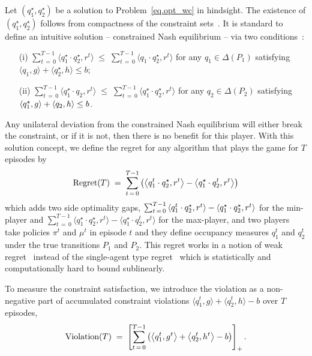 \documentclass[12pt, final]{l4dc2023}
\begin{document}
Let $(q_1^\star,q_2^\star)$ be a solution to Problem~\eqref{eq.opt_wc} in hindsight. The existence of $(q_1^\star,q_2^\star)$ follows from compactness of the constraint sets~\citep{neumann1928theorie,rosen1965existence}. It is standard to define an intuitive solution -- {constrained Nash equilibrium} -- via two conditions~\citep{altman2000constrained,daskalakis2020complexity}:
\begin{itemize}
	\item [(i)] $\displaystyle \sum_{t\,=\,0}^{T-1}\langle q_1^\star\cdot q_2^\star, r^t \rangle \;\leq\; \sum_{t\,=\,0}^{T-1} \langle q_1\cdot q_2^\star, r^t \rangle$ for any $q_1 \in \Delta(P_1)$ satisfying $\langle{q_1},{g}\rangle + \langle{q_2^\star},{h}\rangle\leq b$; 
	
	\item [(ii)] $\displaystyle \sum_{t\,=\,0}^{T-1}\langle q_1^\star\cdot q_2, r^t \rangle \;\leq\; \sum_{t\,=\,0}^{T-1}\langle q_1^\star\cdot q_2^\star, r^t \rangle$ for any $q_2\in\Delta(P_2)$ satisfying $\left\langle q_1^\star,g \right\rangle+\left\langle q_2,h \right\rangle\leq b$. 
\end{itemize}
Any unilateral deviation from the constrained Nash equilibrium will either break the constraint, or if it is not, then there is no benefit for this player.
With this solution concept, we define the regret for any algorithm that plays the game for $T$ episodes by 
\begin{equation}\label{eq.regret}
\text{Regret}(T) \;=\; \sum_{t\,=\,0}^{T-1} \left( \left\langle q_1^t \cdot q_2^\star,r^t \right\rangle - \left\langle q_1^\star \cdot q_2^t,r^t \right\rangle \right)
\end{equation}
which adds two side optimality gaps, $\sum_{t\,=\,0}^{T-1}\left\langle q_1^t \cdot q_2^\star,r^t \right\rangle - \left\langle q_1^\star \cdot q_2^\star,r^t \right\rangle$ for the min-player and $\sum_{t\,=\,0}^{T-1}\langle{q_1^\star \cdot q_2^\star},{r^t}\rangle - \langle{q_1^\star \cdot q_2^t},{r^t}\rangle$ for the max-player, and two players take policies $\pi^t$ and $\mu^t$ in episode $t$ and they define occupancy measures $q_1^t$ and $q_2^t$ under the true transitions $P_1$ and $P_2$. This regret works in a notion of weak regret~\citep{brafman2002r,bai2020provable,xie2020learning} instead of the single-agent type regret~\citep{tian2020provably,bai2020near} which is statistically and computationally hard to bound sublinearly.

To measure the constraint satisfaction, we introduce the violation as a non-negative part of accumulated constraint violations $\langle{q_1^t},{g}\rangle+\langle{q_2^t},{h}\rangle-b$ over $T$ episodes,
\begin{equation}\label{eq.violation}
\text{Violation}(T) \;=\; \left[\sum_{t\,=\,0}^{T-1} \left(\left\langle q_1^t,g^t \right\rangle+\left\langle q_2^t,h^t \right\rangle-b\right)\right]_+.
\end{equation}
\end{document}
